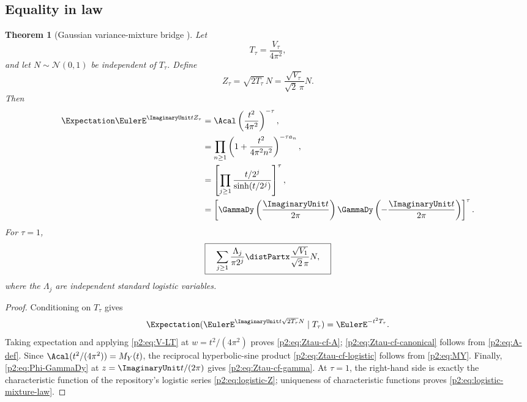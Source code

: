 \documentclass[11pt]{article}
\newtheorem{theorem}{Theorem}[section]
\theoremstyle{definition}
\theoremstyle{remark}
\begin{document}
\subsection{Equality in law}

\begin{theorem}[Gaussian variance-mixture bridge \New]
Let
\begin{equation}
 T_\tau=\frac{V_\tau}{4\pi^2},                            \label{p2:eq:Ttau}
\end{equation}
and let $N\sim\mathcal N(0,1)$ be independent of $T_\tau$.  Define
\begin{equation}
 Z_\tau=\sqrt{2T_\tau}\,N
 =\frac{\sqrt{V_\tau}}{\sqrt2\,\pi}N.                   \label{p2:eq:Ztau-mixture}
\end{equation}
Then
\begin{align}
 \Expectation\EulerE^{\ImaginaryUnit tZ_\tau}
 &=\Acal\left(\frac{t^2}{4\pi^2}\right)^{-\tau},        \label{p2:eq:Ztau-cf-A}\\
 &=\prod_{n\ge1}\left(1+\frac{t^2}{4\pi^2n^2}\right)^{-\tau a_n},
                                                               \label{p2:eq:Ztau-cf-canonical}\\
 &=\left[\prod_{j\ge1}\frac{t/2^j}{\sinh(t/2^j)}\right]^\tau,
                                                               \label{p2:eq:Ztau-cf-logistic}\\
 &=\left[\GammaDy\left(\frac{\ImaginaryUnit t}{2\pi}\right)
          \GammaDy\left(-\frac{\ImaginaryUnit t}{2\pi}\right)\right]^\tau.
                                                               \label{p2:eq:Ztau-cf-gamma}
\end{align}
For $\tau=1$,
\begin{equation}
 \boxed{\quad
 \sum_{j\ge1}\frac{\Lambda_j}{\pi2^j}
 \distPartx
 \frac{\sqrt{V_1}}{\sqrt2\,\pi}N,
 \quad}                                                  \label{p2:eq:logistic-mixture-law}
\end{equation}
where the $\Lambda_j$ are independent standard logistic variables.
\end{theorem}

\begin{proof}
Conditioning on $T_\tau$ gives
\[
 \Expectation(\EulerE^{\ImaginaryUnit t\sqrt{2T_\tau}N}\mid T_\tau)=\EulerE^{-t^2T_\tau}.
\]
Taking expectation and applying \eqref{p2:eq:V-LT} at
$w=t^2/(4\pi^2)$ proves \eqref{p2:eq:Ztau-cf-A};
\eqref{p2:eq:Ztau-cf-canonical} follows from \eqref{p2:eq:A-def}.  Since
$\Acal(t^2/(4\pi^2))=M_Y(t)$, the reciprocal hyperbolic-sine product
\eqref{p2:eq:Ztau-cf-logistic} follows from \eqref{p2:eq:MY}.  Finally,
\eqref{p2:eq:Phi-GammaDy} at $z=\ImaginaryUnit t/(2\pi)$ gives
\eqref{p2:eq:Ztau-cf-gamma}.  At $\tau=1$, the right-hand side is exactly the characteristic
function of the repository's logistic series \eqref{p2:eq:logistic-Z}; uniqueness of
characteristic functions proves \eqref{p2:eq:logistic-mixture-law}.
\end{proof}
\end{document}
